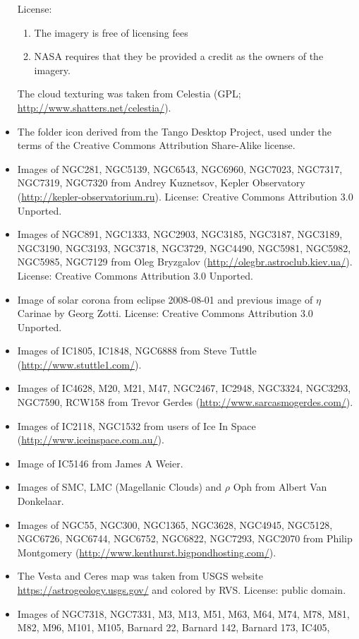 \begin{itemize}
	  License: \begin{enumerate}
	                  \item The imagery is free of licensing fees
		              \item NASA requires that they be provided a credit as the owners of the imagery.
                \end{enumerate}
	  The cloud texturing was taken from Celestia (GPL; \url{http://www.shatters.net/celestia/}).
\item The folder icon derived from the Tango Desktop Project, used under the terms of the Creative Commons Attribution Share-Alike license.
\item Images of NGC281, NGC5139, NGC6543, NGC6960, NGC7023, NGC7317, NGC7319, NGC7320
	  from Andrey Kuznetsov, Kepler Observatory (\url{http://kepler-observatorium.ru}). 
	  License: Creative Commons Attribution 3.0 Unported.
\item Images of NGC891, NGC1333, NGC2903, NGC3185, NGC3187, NGC3189, NGC3190, NGC3193, NGC3718, NGC3729, NGC4490, NGC5981, NGC5982, NGC5985, NGC7129 
	  from Oleg Bryzgalov (\url{http://olegbr.astroclub.kiev.ua/}). License: Creative Commons Attribution 3.0 Unported.
\item Image of solar corona from eclipse 2008-08-01 and previous image of $\eta$ Carinae by Georg Zotti. License: Creative Commons Attribution 3.0 Unported.
\item Images of IC1805, IC1848, NGC6888 from Steve Tuttle (\url{http://www.stuttle1.com/}).
\item Images of IC4628, M20, M21, M47, NGC2467, IC2948, NGC3324, NGC3293, NGC7590, RCW158 from Trevor Gerdes (\url{http://www.sarcasmogerdes.com/}).
\item Images of IC2118, NGC1532 from users of Ice In Space (\url{http://www.iceinspace.com.au/}).
\item Image of IC5146 from James A Weier.
\item Images of SMC, LMC (Magellanic Clouds) and $\rho$ Oph from Albert Van Donkelaar.
\item Images of NGC55, NGC300, NGC1365, NGC3628, NGC4945, NGC5128, NGC6726, NGC6744, NGC6752, NGC6822, NGC7293, NGC2070
	  from Philip Montgomery (\url{http://www.kenthurst.bigpondhosting.com/}).
\item The Vesta and Ceres map was taken from USGS website \url{https://astrogeology.usgs.gov/} and colored by RVS. License: public domain.
\item Images of NGC7318, NGC7331, M3, M13, M51, M63, M64, M74, M78, M81, M82, M96, M101, M105, Barnard 22, Barnard 142, Barnard 173, IC405,

\end{itemize}
